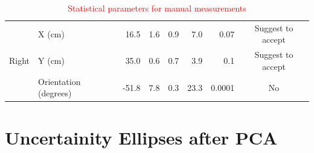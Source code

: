 \begin{itemize}
\begin{table}[!ht]
{\begin{tabular}{llrrrrrc}
    \multirow{3}{*}{Right}   & X (cm)                & 16.5      & 1.6           & 0.9           & 7.0   & 0.07    & Suggest to accept                                                                               \\ 
                             & {Y (cm)}                & 35.0      & 0.6           & 0.7           &  3.9     & 0.1    & {Suggest to accept}                                                                                    \\ 
                             & Orientation (degrees) & -51.8     & 7.8           & 0.3           &  23.3    & 0.0001     & No                                                                                    \\  \hline
    \end{tabular}%
    }
    \caption{\textcolor{red}{Statistical parameters for manual measurements}}
    \label{tab:stats-for-manual-measurements-2}
    \end{table}

    \end{itemize}
    

    
    \section{Uncertainity Ellipses after PCA}
    
